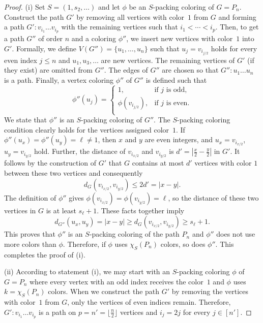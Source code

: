 \documentclass[12pt]{article}
\begin{document}
\begin{proof}
    (i) Set $S=(1, s_2, \dots)$ and let $\phi$ be an $S$-packing coloring of $G=P_n$. Construct the path $G'$ by removing all vertices with color~$1$ from $G$ and forming a path $G': v_{i_1}\dots v_{i_p}$ with the remaining vertices such that $i_1 < \cdots < i_p$. Then, to get a path $G''$ of order $n$ and a coloring $\phi''$, we insert new vertices with color~$1$ into $G'$. Formally, we    
    define $V(G'')=\{u_1,\dots , u_n\}$ such that $u_j= v_{i_{j/2}}$ holds for every even index $j \leq n$ and $u_1, u_3, \dots$ are new vertices. The remaining vertices of $G'$ (if they exist) are omitted from $G''$.  The edges of $G''$ are chosen so that $G''\colon u_1 \dots u_n$ is a path. Finally, a vertex coloring $\phi''$ of $G''$ is defined such that 
    $$
    \phi''(u_j)= 
    \begin{cases}
	1, &\text{if $j$ is odd},\\
	\phi(v_{i_{j/2}}), &\text{if $j$ is even}.\\
    \end{cases}
    $$
    We state that $\phi''$ is an $S$-packing coloring of $G''$. The $S$-packing coloring condition clearly holds for the vertices assigned color~$1$. If $\phi''(u_x)= \phi''(u_y)= \ell \neq 1$, then $x$ and $y$ are even integers, and $u_x=v_{i_{x/2}}$, $u_y=v_{i_{y/2}}$ hold. Further, the distance of $v_{i_{x/2}}$ and $v_{i_{y/2}}$ is $d'=|\frac{x}{2} - \frac{y}{2}|$ in $G'$. It follows by the construction of $G'$ that $G$ contains at most $d'$ vertices with color $1$ between these two vertices and consequently $$d_G(v_{i_{x/2}},v_{i_{y/2}}) \leq 2d' =|x-y|. $$
    The definition of $\phi''$ gives $\phi(v_{i_{x/2}})=\phi(v_{i_{y/2}})=\ell $, so the distance of these two vertices in $G$ is at least $s_\ell+1$. These facts together imply
     $$ d_{G''}(u_x,u_y) = |x-y| \ge d_G(v_{i_{x/2}},v_{i_{y/2}}) \ge s_\ell +1.
    $$
    This proves that $\phi''$ is an $S$-packing coloring of the path $P_n$ and $\phi''$ does not use more colors than $\phi$. Therefore, if $\phi$ uses $\chi_S(P_n)$ colors, so does $\phi''$. This completes the proof of (i). 
    \medskip

    (ii) According to statement (i), we may start with an $S$-packing coloring $\phi$ of $G=P_n$ where every vertex with an odd index receives the color~$1$ and $\phi$ uses $k=\chi_S(P_n)$ colors. When we construct the path $G'$ by removing the vertices with color~$1$ from $G$, only the vertices of even indices remain. Therefore, $G': v_{i_1}\dots v_{i_p}$ is a path on $p=n'= \lfloor \frac{n}{2} \rfloor$ vertices and $i_j=2j$ for every $j \in [n']$. 
    

\end{proof}
\end{document}
